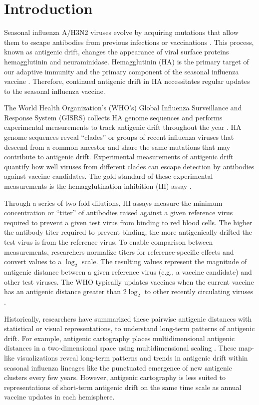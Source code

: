 \documentclass[utf8]{FrontiersinHarvard} %
\begin{document}
\section{Introduction}

Seasonal influenza A/H3N2 viruses evolve by acquiring mutations that allow them to escape antibodies from previous infections or vaccinations \citep{Petrova2018}.
This process, known as antigenic drift, changes the appearance of viral surface proteins hemagglutinin and neuraminidase.
Hemagglutinin (HA) is the primary target of our adaptive immunity and the primary component of the seasonal influenza vaccine \citep{}.
Therefore, continued antigenic drift in HA necessitates regular updates to the seasonal influenza vaccine.

The World Health Organization's (WHO's) Global Influenza Surveillance and Response System (GISRS) collects HA genome sequences and performs experimental measurements to track antigenic drift throughout the year \citep{Morris:2017ea}.
HA genome sequences reveal ``clades'' or groups of recent influenza viruses that descend from a common ancestor and share the same mutations that may contribute to antigenic drift.
Experimental measurements of antigenic drift quantify how well viruses from different clades can escape detection by antibodies against vaccine candidates.
The gold standard of these experimental measurements is the hemagglutination inhibition (HI) assay \citep{hirst1943studies}.

Through a series of two-fold dilutions, HI assays measure the minimum concentration or ``titer'' of antibodies raised against a given reference virus required to prevent a given test virus from binding to red blood cells.
The higher the antibody titer required to prevent binding, the more antigenically drifted the test virus is from the reference virus.
To enable comparison between measurements, researchers normalize titers for reference-specific effects and convert values to a $\log_{2}$ scale.
The resulting values represent the magnitude of antigenic distance between a given reference virus (e.g., a vaccine candidate) and other test viruses.
The WHO typically updates vaccines when the current vaccine has an antigenic distance greater than ${2\log_{2}}$ to other recently circulating viruses \citep{Katz2011}.

Historically, researchers have summarized these pairwise antigenic distances with statistical or visual representations, to understand long-term patterns of antigenic drift.
For example, antigenic cartography places multidimensional antigenic distances in a two-dimensional space using multidimensional scaling \citep{Smith:2004jc,Bedford:2014bf}.
These map-like visualizations reveal long-term patterns and trends in antigenic drift within seasonal influenza lineages like the punctuated emergence of new antigenic clusters every few years.
However, antigenic cartography is less suited to representations of short-term antigenic drift on the same time scale as annual vaccine updates in each hemisphere.
\end{document}
